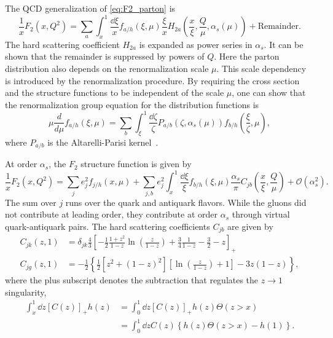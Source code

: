 \documentclass[../main.tex]{subfiles}
\begin{document}
The QCD generalization of \cref{eq:F2_parton} is
\begin{equation}
	\frac{1}{x}F_2\left(x,Q^2\right) = \sum_a \int_x^1 \frac{\dd{\xi}}{x}f_{a/h}\left(\xi,\mu\right)\frac{\xi}{x}H_{2a}\left( \frac{x}{\xi}, \frac{Q}{\mu}, \alpha_s\left(\mu\right)\right)
	+ \text{Remainder}.
\end{equation}
The hard scattering coefficient $H_{2a}$ is expanded as power series in $\alpha_s$. It
can be shown that the remainder is suppressed by powers of $Q$. Here the parton
distribution also depends on the renormalization scale $\mu$. This scale
dependency is introduced by the renormalization procedure. By requiring the cross
section and the structure functions to be independent of the scale $\mu$,
one can show that the renormalization group equation for the distribution
functions is
\begin{equation}
	\mu\frac{d}{d\mu}f_{a/h}\left(\xi,\mu\right)=\sum_b \int_\xi^1 \frac{\dd{\zeta}}{\zeta} P_{a/b}\left(\zeta,\alpha_s\left(\mu\right)\right) f_{b/h}\left(\frac{\xi}{\zeta},\mu\right),
\end{equation}
where $P_{a/b}$ is the Altarelli-Parisi kernel~\cite{altarelli1977}.

At order $\alpha_s$, the $F_2$ structure function is given by~\cite{collins1989}
\begin{equation}
	\frac{1}{x} F_2\left(x,Q^2\right) = \sum_j e^2_j f_{j/h}\left(x,\mu\right) + \sum_{j,b} e^2_j \int^1_x \frac{\dd{\xi}}{\xi} f_{b/h}\left(\xi,\mu\right) \frac{\alpha_s}{\pi} C_{jb}\left(\frac{x}{\xi}, \frac{Q}{\mu}\right) + \mathcal{O}(\alpha_s^2).
\end{equation}
The sum over $j$ runs over the quark and antiquark flavors. While the gluons
did not contribute at leading order, they contribute at order $\alpha_s$ through
virtual quark-antiquark pairs. The hard scattering coefficients $C_{jb}$ are
given by
\begin{align}
	C_{jk}(z,1) & = \delta_{jk} \frac{4}{3} \left[ -\frac{1}{2}\frac{1+z^2}{1-z} \ln\left(\frac{z}{1-z}\right) + \frac{3}{4} \frac{1}{1-z} -\frac{3}{2} -z\right]_+ \\
	C_{jg}(z,1) & = -\frac{1}{2} \left\{ \frac{1}{2}\left[z^2+(1-z)^2\right] \left[\ln\left(\frac{z}{1-z}\right)+1\right] -3z(1-z)\right\},
\end{align}
where the plus subscript denotes the subtraction that regulates the $z\rightarrow1$
singularity,
\begin{equation}
	\begin{split}
		\int^1_x \dd{z} \left[C(z)\right]_+ h(z) & = \int_0^1 \dd{z} \left[C(z)\right]_+ h(z)\Theta(z>x)        \\
		                                         & = \int_0^1 \dd{z} C(z) \left\{h(z)\Theta(z>x) -h(1)\right\}.
	\end{split}
\end{equation}
\end{document}
